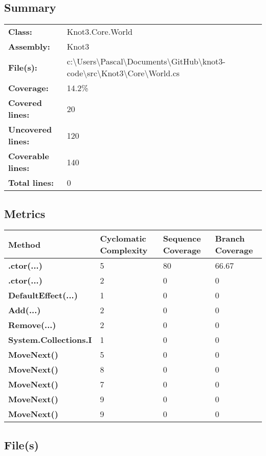 \documentclass[a4paper,10pt]{article}
\begin{document}
\subsection{Summary}
\begin{longtable}[l]{ll}
\textbf{Class:} & Knot3.Core.World\\
\textbf{Assembly:} & Knot3\\
\textbf{File(s):} & \begin{minipage}[t]{12cm}{c:\textbackslash Users\textbackslash Pascal\textbackslash Documents\textbackslash GitHub\textbackslash knot3-code\textbackslash src\textbackslash Knot3\textbackslash Core\textbackslash World.cs}\end{minipage} \\
\textbf{Coverage:} & 14.2\%\\
\textbf{Covered lines:} & 20\\
\textbf{Uncovered lines:} & 120\\
\textbf{Coverable lines:} & 140\\
\textbf{Total lines:} & 0\\
\end{longtable}
\subsection{Metrics}
\begin{longtable}[l]{|l|l|l|l|}
\hline
\textbf{Method} & \textbf{Cyclomatic Complexity} & \textbf{Sequence Coverage} & \textbf{Branch Coverage}\\
\hline
\textbf{.ctor(...)} & 5 & 80 & 66.67\\
\hline
\textbf{.ctor(...)} & 2 & 0 & 0\\
\hline
\textbf{DefaultEffect(...)} & 1 & 0 & 0\\
\hline
\textbf{Add(...)} & 2 & 0 & 0\\
\hline
\textbf{Remove(...)} & 2 & 0 & 0\\
\hline
\textbf{System.Collections.I} & 1 & 0 & 0\\
\hline
\textbf{MoveNext()} & 5 & 0 & 0\\
\hline
\textbf{MoveNext()} & 8 & 0 & 0\\
\hline
\textbf{MoveNext()} & 7 & 0 & 0\\
\hline
\textbf{MoveNext()} & 9 & 0 & 0\\
\hline
\textbf{MoveNext()} & 9 & 0 & 0\\
\hline
\end{longtable}
\subsection{File(s)}
\end{document}
